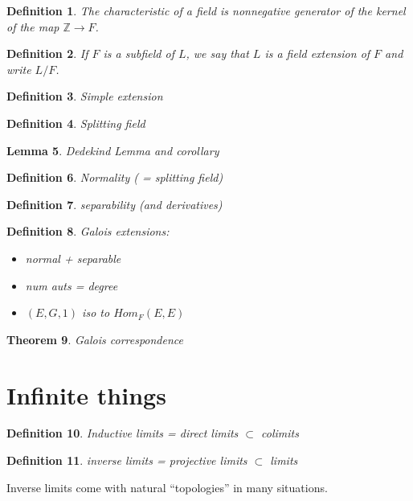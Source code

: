 \documentclass[12pt]{report}
\theoremstyle{plain}
\newtheorem{thm}{Theorem}[section]
\newtheorem{defn}[thm]{Definition}
\newtheorem{lem}[thm]{Lemma}
\begin{document}
\begin{defn}
The characteristic of a field is nonnegative generator of the kernel of the
map $\mathbb Z \to F$.
\end{defn}

\begin{defn}
If $F$ is a subfield of $L$, we say that $L$ is a field extension of $F$
and write $L/F$.
\end{defn}

\begin{defn}
Simple extension
\end{defn}

\begin{defn}
Splitting field
\end{defn}

\begin{lem}
Dedekind Lemma and corollary
\end{lem}

\begin{defn}
Normality ( = splitting field)
\end{defn}

\begin{defn}
separability (and derivatives)
\end{defn}

\begin{defn}
Galois extensions:
\begin{itemize}
\item normal + separable
\item num auts = degree
\item $(E, G, 1)$ iso to $Hom_F(E, E)$
\end{itemize}
\end{defn}

\begin{thm}
Galois correspondence
\end{thm}

\section{Infinite things}

\begin{defn}
Inductive limits = direct limits $\subset$ colimits
\end{defn}

\begin{defn}
inverse limits = projective limits $\subset$ limits
\end{defn}

Inverse limits come with natural ``topologies'' in many situations.
\end{document}
